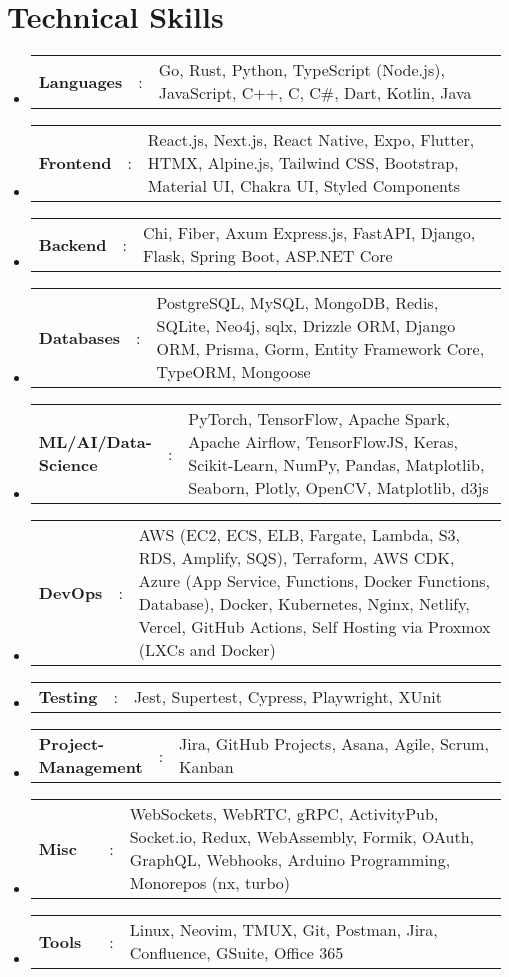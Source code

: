 \documentclass[a4paper,11pt]{article}
\newcommand{\resumeSectionType}[3]{
  \item\begin{tabular*}{0.96\textwidth}[t]{
    p{0.15\linewidth}p{0.02\linewidth}p{0.81\linewidth}
  }
    \textbf{#1} & #2 & #3
  \end{tabular*}\vspace{-2pt}
}
\newcommand{\resumeHeadingListStart}{
  \begin{itemize}[leftmargin=0.15in, label={}]
}
\newcommand{\resumeHeadingListEnd}{\end{itemize}}
\begin{document}
\section{\LARGE{Technical Skills}}
  \resumeHeadingListStart{}
    \resumeSectionType{Languages}{:}{Go, Rust, Python, TypeScript (Node.js), JavaScript, C++, C, C\#, Dart, Kotlin, Java}
    \resumeSectionType{Frontend}{:}{React.js, Next.js, React Native, Expo, Flutter, HTMX, Alpine.js, Tailwind CSS, Bootstrap, Material UI, Chakra UI, Styled Components}
    \resumeSectionType{Backend}{:}{Chi, Fiber, Axum Express.js, FastAPI, Django, Flask, Spring Boot, ASP.NET Core}
    \resumeSectionType{Databases}{:}{PostgreSQL, MySQL, MongoDB, Redis, SQLite, Neo4j, sqlx, Drizzle ORM, Django ORM, Prisma, Gorm, Entity Framework Core, TypeORM, Mongoose}
	\resumeSectionType{ML/AI/Data-Science}{:}{PyTorch, TensorFlow, Apache Spark, Apache Airflow, TensorFlowJS, Keras, Scikit-Learn, NumPy, Pandas, Matplotlib, Seaborn, Plotly, OpenCV, Matplotlib, d3js}
    \resumeSectionType{DevOps}{:}{AWS (EC2, ECS, ELB, Fargate, Lambda, S3, RDS, Amplify, SQS), Terraform, AWS CDK, Azure (App Service, Functions, Docker Functions, Database), Docker, Kubernetes, Nginx, Netlify, Vercel, GitHub Actions, Self Hosting via Proxmox (LXCs and Docker)}
	\resumeSectionType{Testing}{:}{Jest, Supertest, Cypress, Playwright, XUnit}
	\resumeSectionType{Project-Management}{:}{Jira, GitHub Projects, Asana, Agile, Scrum, Kanban}
	\resumeSectionType{Misc}{:}{WebSockets, WebRTC, gRPC, ActivityPub, Socket.io, Redux, WebAssembly, Formik, OAuth, GraphQL, Webhooks, Arduino Programming, Monorepos (nx, turbo)}
	\resumeSectionType{Tools}{:}{Linux, Neovim, TMUX, Git, Postman, Jira, Confluence, GSuite, Office 365}
  \resumeHeadingListEnd{}


\end{document}

